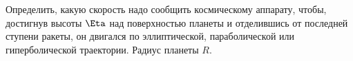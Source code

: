 Определить, какую скорость надо сообщить космическому аппарату, чтобы, достигнув высоты $\Eta$ над поверхностью планеты
и отделившись от последней ступени ракеты, он двигался по эллиптической, параболической или гиперболической траектории.
Радиус планеты $R$.
